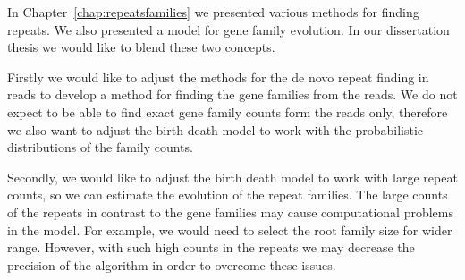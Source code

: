 In Chapter~\ref{chap:repeatsfamilies} we presented various methods for finding repeats. We also presented a model for gene family evolution.
In our dissertation thesis we would like to blend these two concepts.

Firstly we would like to adjust the methods for the de novo repeat finding in reads to develop a method for finding the gene families from the reads.
We do not expect to be able to find exact gene family counts form the reads only, therefore we also want to adjust the birth death model to work with the probabilistic distributions of the family counts.

Secondly, we would like to adjust the birth death model to work with large repeat counts, so we can estimate the evolution of the repeat families. The large counts of the repeats in contrast to the gene families may cause computational problems in the model. For example, we would need to select the root family size for wider range. However, with such high counts in the repeats we may decrease the precision of the algorithm in order to overcome these issues.
